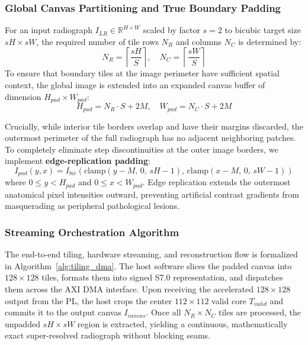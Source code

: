 \documentclass[conference]{IEEEtran}
\begin{document}
\subsubsection{Global Canvas Partitioning and True Boundary Padding}
For an input radiograph $I_{LR} \in \mathbb{R}^{H \times W}$ scaled by factor $s = 2$ to bicubic target size $sH \times sW$, the required number of tile rows $N_R$ and columns $N_C$ is determined by:
\begin{equation}
N_R = \left\lceil \frac{sH}{S} \right\rceil, \quad N_C = \left\lceil \frac{sW}{S} \right\rceil
\label{eq:tile_grid}
\end{equation}
To ensure that boundary tiles at the image perimeter have sufficient spatial context, the global image is extended into an expanded canvas buffer of dimension $H_{pad} \times W_{pad}$:
\begin{equation}
H_{pad} = N_R \cdot S + 2M, \quad W_{pad} = N_C \cdot S + 2M
\label{eq:canvas_pad}
\end{equation}

Crucially, while interior tile borders overlap and have their margins discarded, the outermost perimeter of the full radiograph has no adjacent neighboring patches. To completely eliminate step discontinuities at the outer image borders, we implement \textbf{edge-replication padding}:
\begin{equation}
I_{pad}(y, x) = I_{bic}\left(\text{clamp}(y - M,\, 0,\, sH - 1),\, \text{clamp}(x - M,\, 0,\, sW - 1)\right)
\label{eq:edge_pad}
\end{equation}
where $0 \le y < H_{pad}$ and $0 \le x < W_{pad}$. Edge replication extends the outermost anatomical pixel intensities outward, preventing artificial contrast gradients from masquerading as peripheral pathological lesions.

\subsubsection{Streaming Orchestration Algorithm}
The end-to-end tiling, hardware streaming, and reconstruction flow is formalized in Algorithm~\ref{alg:tiling_dma}. The host software slices the padded canvas into $128 \times 128$ tiles, formats them into signed S7.0 representation, and dispatches them across the AXI DMA interface. Upon receiving the accelerated $128 \times 128$ output from the PL, the host crops the center $112 \times 112$ valid core $T_{valid}$ and commits it to the output canvas $I_{canvas}$. Once all $N_R \times N_C$ tiles are processed, the unpadded $sH \times sW$ region is extracted, yielding a continuous, mathematically exact super-resolved radiograph without blocking seams.
\end{document}
